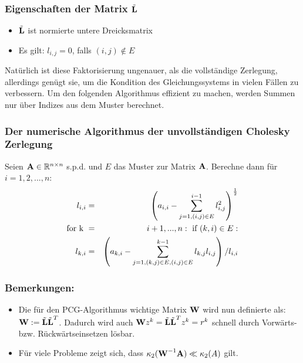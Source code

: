 \subsubsection{Eigenschaften der Matrix $\tilde{{\textbf{L}}}$}
\begin{itemize}
\item $\tilde{{\textbf{L}}}$ ist normierte untere Dreicksmatrix
\item Es gilt: $l_{i,j} = 0$, falls $(i,j) \notin E$
\end{itemize}

Natürlich ist diese Faktorisierung ungenauer, als die vollständige Zerlegung, allerdings genügt sie, um die Kondition des Gleichungssystems in vielen Fällen zu verbessern. Um den folgenden Algorithmus effizient zu machen, werden Summen nur über Indizes aus dem Muster berechnet.

\subsubsection{Der numerische Algorithmus der unvollständigen Cholesky Zerlegung}

Seien ${\textbf{A}} \in \mathbb{R}^{n \times n}$ s.p.d. und $E$ das Muster zur Matrix ${\textbf{A}}$. Berechne dann für $i=1,2,...,n$:
\begin{eqnarray}
l_{i,i} &=& \left( a_{i,i} - \sum^{i-1}_{j=1,(i,j) \in E} l_{i,j}^{2} \right)^{\frac {1} {2}} \\
\textnormal{for k } &=& i+1,...,n: \textnormal{ if } (k,i) \in E: \\
l_{k,i} &=& \left( a_{k,i} - \sum^{k-1}_{j=1,(k,j) \in E, (i,j) \in E} l_{k,j} l_{i,j} \right) / l_{i,i}
\end{eqnarray}

\subsubsection{Bemerkungen:}

\begin{itemize}
\item Die für den PCG-Algorithmus wichtige Matrix ${\textbf{W}}$ wird nun definierte als: ${\textbf{W}} := \tilde{{\textbf{L}}} \tilde{{\textbf{L}}}^{T}$. Dadurch wird auch ${\textbf{W}}z^{k} = \tilde{{\textbf{L}}} \tilde{{\textbf{L}}}^{T}z^{k} = r^{k}$ schnell durch Vorwärts- bzw. Rückwärtseinsetzen lösbar.
\item Für viele Probleme zeigt sich, dass $\kappa_{2}({\textbf{W}}^{-1} {\textbf{A}}) \ll \kappa_{2} (A)$ gilt. \\
\end{itemize}

